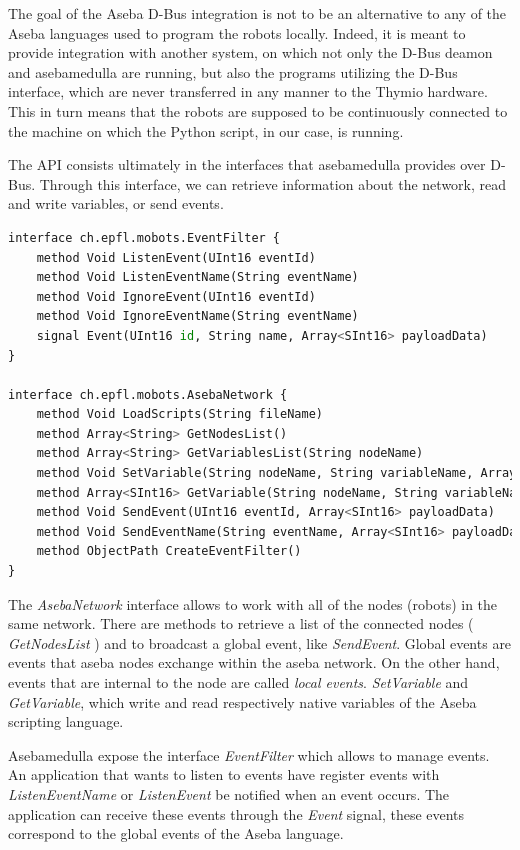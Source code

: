 \documentclass[format=acmsmall, review=false, screen=true]{acmart}
\begin{document}
The goal of the Aseba D-Bus integration is not to be an alternative to any of the Aseba languages used to program the robots locally. Indeed, it is meant to provide integration with another system, on which not only the D-Bus deamon and asebamedulla are running, but also the programs utilizing the D-Bus interface, which are never transferred in any manner to the Thymio hardware. This in turn means that the robots are supposed to be continuously connected to the machine on which the Python script, in our case, is running.

The API consists ultimately in the interfaces that asebamedulla provides over D-Bus. Through this interface, we can retrieve information about the network, read and write variables, or send events.

\begin{lstlisting}[caption={\ The API that asebamedulla provides over D-Bus},language=Python,captionpos=b,label={Asebamedulla API},basicstyle=\small]
interface ch.epfl.mobots.EventFilter {
    method Void ListenEvent(UInt16 eventId)
    method Void ListenEventName(String eventName)
    method Void IgnoreEvent(UInt16 eventId)
    method Void IgnoreEventName(String eventName)
    signal Event(UInt16 id, String name, Array<SInt16> payloadData)
}

interface ch.epfl.mobots.AsebaNetwork {
    method Void LoadScripts(String fileName)
    method Array<String> GetNodesList()
    method Array<String> GetVariablesList(String nodeName)
    method Void SetVariable(String nodeName, String variableName, Array<SInt16> variableData)
    method Array<SInt16> GetVariable(String nodeName, String variableName)
    method Void SendEvent(UInt16 eventId, Array<SInt16> payloadData)
    method Void SendEventName(String eventName, Array<SInt16> payloadData)
    method ObjectPath CreateEventFilter()
}
\end{lstlisting}


The \emph{AsebaNetwork} interface allows to work with all of the nodes (robots) in the same network. There are methods to retrieve a list of the connected nodes ( \emph{GetNodesList} ) and to broadcast a global event, like \emph{SendEvent}. Global events are events that aseba nodes exchange within the aseba network. On the other hand, events that are internal to the node are called \emph{local events}. \emph{SetVariable} and \emph{GetVariable}, which write and read respectively native variables of the Aseba scripting language.

Asebamedulla expose the interface \emph{EventFilter} which allows to manage events. An application that wants to listen to events have register events with \emph{ListenEventName} or \emph{ListenEvent} be notified when an event occurs. The application can receive these events through the \emph{Event} signal, these events correspond to the global events of the Aseba language.
\end{document}
